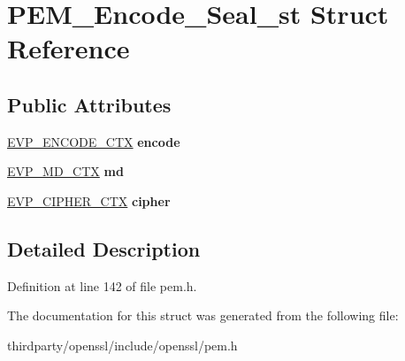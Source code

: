 \hypertarget{struct_p_e_m___encode___seal__st}{}\section{P\+E\+M\+\_\+\+Encode\+\_\+\+Seal\+\_\+st Struct Reference}
\label{struct_p_e_m___encode___seal__st}
\subsection*{Public Attributes}
\begin{DoxyCompactItemize}
\item 
\mbox{\label{struct_p_e_m___encode___seal__st_a47cfc43decced4ead8d4939f37ff5d32}} 
\hyperlink{structevp___encode___ctx__st}{E\+V\+P\+\_\+\+E\+N\+C\+O\+D\+E\+\_\+\+C\+TX} {\bfseries encode}
\item 
\mbox{\label{struct_p_e_m___encode___seal__st_abdc58bdc153bb43dcf29e7a6a339f8bd}} 
\hyperlink{structenv__md__ctx__st}{E\+V\+P\+\_\+\+M\+D\+\_\+\+C\+TX} {\bfseries md}
\item 
\mbox{\label{struct_p_e_m___encode___seal__st_a5a3c09ebd5be8036df38f8f623f5ef79}} 
\hyperlink{structevp__cipher__ctx__st}{E\+V\+P\+\_\+\+C\+I\+P\+H\+E\+R\+\_\+\+C\+TX} {\bfseries cipher}
\end{DoxyCompactItemize}


\subsection{Detailed Description}


Definition at line 142 of file pem.\+h.



The documentation for this struct was generated from the following file\+:\begin{DoxyCompactItemize}
\item 
thirdparty/openssl/include/openssl/pem.\+h\end{DoxyCompactItemize}
